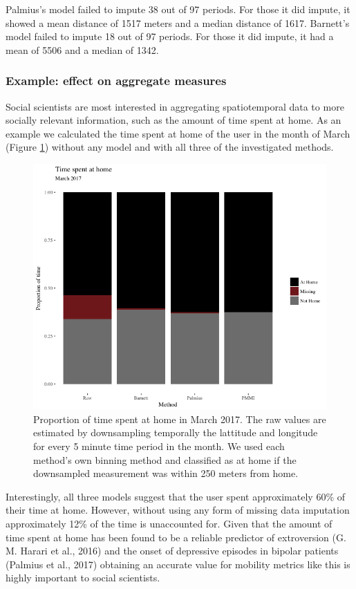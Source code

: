 \documentclass[man]{apa6}
\theoremstyle{definition}
\theoremstyle{definition}
\theoremstyle{definition}
\theoremstyle{remark}
\begin{document}
Palmius's model failed to impute 38 out of 97 periods. For those it did
impute, it showed a mean distance of 1517 meters and a median distance
of 1617. Barnett's model failed to impute 18 out of 97 periods. For
those it did impute, it had a mean of 5506 and a median of 1342.

\subsubsection{Example: effect on aggregate
measures}\label{example-effect-on-aggregate-measures}

Social scientists are most interested in aggregating spatiotemporal data
to more socially relevant information, such as the amount of time spent
at home. As an example we calculated the time spent at home of the user
in the month of March (Figure \ref{fig:aggrePlot}) without any model and
with all three of the investigated methods.

\begin{figure}
\includegraphics[width=1\linewidth]{img/timeUse} \caption{Proportion of time spent at home in March 2017. The raw values are estimated by downsampling temporally the lattitude and longitude for every 5 minute time period in the month. We used each method's own binning method and classified as at home if the downsampled measurement was within 250 meters from home.}\label{fig:aggrePlot}
\end{figure}

Interestingly, all three models suggest that the user spent
approximately 60\% of their time at home. However, without using any
form of missing data imputation approximately 12\% of the time is
unaccounted for. Given that the amount of time spent at home has been
found to be a reliable predictor of extroversion (G. M. Harari et al.,
2016) and the onset of depressive episodes in bipolar patients (Palmius
et al., 2017) obtaining an accurate value for mobility metrics like this
is highly important to social scientists.
\end{document}
